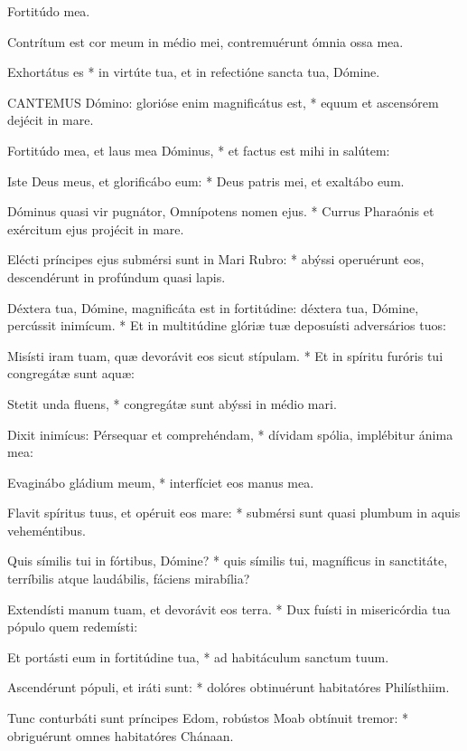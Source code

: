  Fortitúdo mea.


 Contrítum est cor meum in médio mei, contremuérunt ómnia ossa mea.

 Exhortátus es * in virtúte tua, et in refectióne sancta tua, Dómine.


\lettrine[lines=2]{C}{ANTEMUS} Dómino: glorióse enim magnificátus est, * equum et ascensórem dejécit in mare.

Fortitúdo mea, et laus mea Dóminus, * et factus est mihi in salútem:

Iste Deus meus, et glorificábo eum: * Deus patris mei, et exaltábo eum.

Dóminus quasi vir pugnátor, Omnípotens nomen ejus. * Currus Pharaónis et exércitum ejus projécit in mare.

Elécti príncipes ejus submérsi sunt in Mari Rubro: * abýssi operuérunt eos, descendérunt in profúndum quasi lapis.

Déxtera tua, Dómine, magnificáta est in fortitúdine: déxtera tua, Dómine, percússit inimícum. * Et in multitúdine glóriæ tuæ deposuísti adversários tuos:

Misísti iram tuam, quæ devorávit eos sicut stípulam. * Et in spíritu furóris tui congregátæ sunt aquæ:

Stetit unda fluens, * congregátæ sunt abýssi in médio mari.

Dixit inimícus: Pérsequar et comprehéndam, * dívidam spólia, implébitur ánima mea:

Evaginábo gládium meum, * interfíciet eos manus mea.

Flavit spíritus tuus, et opéruit eos mare: * submérsi sunt quasi plumbum in aquis veheméntibus.

Quis símilis tui in fórtibus, Dómine? * quis símilis tui, magníficus in sanctitáte, terríbilis atque laudábilis, fáciens mirabília?

Extendísti manum tuam, et devorávit eos terra. * Dux fuísti in misericórdia tua pópulo quem redemísti:

Et portásti eum in fortitúdine tua, * ad habitáculum sanctum tuum.

Ascendérunt pópuli, et iráti sunt: * dolóres obtinuérunt habitatóres Philísthiim.

Tunc conturbáti sunt príncipes Edom, robústos Moab obtínuit tremor: * obriguérunt omnes habitatóres Chánaan.

